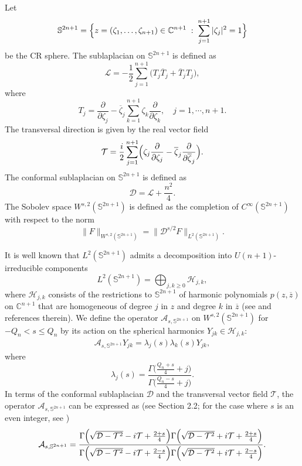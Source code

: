 \documentclass[12pt,reqno]{amsart}%
\theoremstyle{plain}
\numberwithin{equation}{section}
\begin{document}
Let
\[
\mathbb{S}^{2n+1} = \Bigl\{ z=(\zeta_{1},\dots,\zeta_{n+1}) \in \mathbb{C}^{n+1} \;:\; \sum_{j=1}^{n+1} |\zeta_{j}|^{2}=1 \Bigr\}
\]
be the CR sphere. The sublaplacian on \(\mathbb{S}^{2n+1}\) is defined as
\[
\mathcal{L} = -\frac{1}{2} \sum_{j=1}^{n+1} \bigl( T_j \overline{T}_j + \overline{T}_j T_j \bigr),
\]
where
\[
T_j = \frac{\partial}{\partial \zeta_j} - \overline{\zeta}_j \sum_{k=1}^{n+1} \zeta_k \frac{\partial}{\partial \zeta_k}, \quad j=1,\cdots,n+1.
\]
The transversal direction is given by the real vector field
\[
\mathcal{T} = \frac{i}{2} \sum_{j=1}^{n+1} \Bigl( \zeta_j \frac{\partial}{\partial \zeta_j} - \overline{\zeta}_j \frac{\partial}{\partial \overline{\zeta}_j} \Bigr).
\]
The conformal sublaplacian on \(\mathbb{S}^{2n+1}\) is defined as
\[
\mathcal{D} = \mathcal{L} + \frac{n^2}{4}.
\]
The Sobolev space \(W^{s,2}(\mathbb{S}^{2n+1})\) is defined as the completion of \(C^\infty(\mathbb{S}^{2n+1})\) with respect to the norm
\[
\|F\|_{W^{s,2}(\mathbb{S}^{2n+1})} = \|\mathcal{D}^{s/2}F\|_{L^2(\mathbb{S}^{2n+1})}.
\]


It is well known that \(L^2(\mathbb{S}^{2n+1})\) admits a decomposition into \(U(n+1)\)-irreducible components
\[
L^2(\mathbb{S}^{2n+1}) = \bigoplus_{j,k \geq 0} \mathcal{H}_{j,k},
\]
where \(\mathcal{H}_{j,k}\) consists of the restrictions to \(\mathbb{S}^{2n+1}\) of harmonic polynomials \(p(z,\overline{z})\) on \(\mathbb{C}^{n+1}\) that are homogeneous of degree \(j\) in \(z\) and degree \(k\) in \(\overline{z}\) (see \cite{fo,tha2} and references therein).
We define the operator \(\mathcal{A}_{s,\mathbb{S}^{2n+1}}\) on \(W^{s,2}(\mathbb{S}^{2n+1})\) for \(-Q_n < s \leq Q_n\) by its action on the spherical harmonics \(Y_{jk}\in\mathcal{H}_{j,k}\):
\begin{align}\label{1.5}
\mathcal{A}_{s,\mathbb{S}^{2n+1}} Y_{jk} = \lambda_j(s)\lambda_k(s)Y_{jk},
\end{align}
where
\[
\lambda_j(s) = \frac{\Gamma\bigl(\frac{Q_n+s}{4} + j\bigr)}{\Gamma\bigl(\frac{Q_n-s}{4} + j\bigr)}.
\]
In terms of the conformal sublaplacian \(\mathcal{D}\) and the transversal vector field \(\mathcal{T}\), the operator \(\mathcal{A}_{s,\mathbb{S}^{2n+1}}\) can be expressed as (see Section 2.2; for the case where \(s\) is an even integer, see   \cite{br1})
\begin{align}\label{As}
\mathcal{A}_{s,\mathbb{S}^{2n+1}}
= \frac{\Gamma\Bigl(\sqrt{\mathcal{D}-\mathcal{T}^{2}}-i\mathcal{T}+\frac{2+s}{4}\Bigr)
      \Gamma\Bigl(\sqrt{\mathcal{D}-\mathcal{T}^{2}}+i\mathcal{T}+\frac{2+s}{4}\Bigr)}
     {\Gamma\Bigl(\sqrt{\mathcal{D}-\mathcal{T}^{2}}-i\mathcal{T}+\frac{2-s}{4}\Bigr)
      \Gamma\Bigl(\sqrt{\mathcal{D}-\mathcal{T}^{2}}+i\mathcal{T}+\frac{2-s}{4}\Bigr)}.
\end{align}
\end{document}
